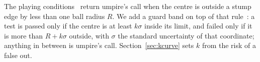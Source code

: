The playing conditions~\cite{icc2023drs} return umpire's call when the centre is outside a stump edge by
less than one ball radius $R$. We add a guard band on top of that rule~\cite{jcgm106,carullo2024conformity}: a
test is passed only if the centre is at least $k\sigma$ inside its limit, and failed only if it is more than
$R + k\sigma$ outside, with $\sigma$ the standard uncertainty of that coordinate; anything in between is
umpire's call. Section~\ref{sec:kcurve} sets $k$ from the risk of a false out.
